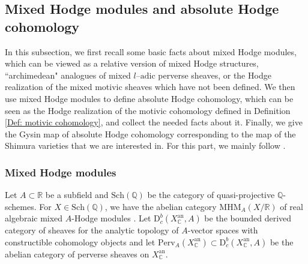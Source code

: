 \documentclass[11pt, a4paper]{amsart}
\theoremstyle{plain}
\theoremstyle{definition}
\numberwithin{equation}{section}
\def\CC{\mathbb{C}}
\def\QQ{\mathbb{Q}}
\def\RR{\mathbb{R}}
\begin{document}
 \subsection{Mixed Hodge modules and absolute Hodge cohomology}
 \label{SS:MHM and abs Hodge coh}
 
 In this subsection, we first recall some basic facts about mixed Hodge modules, which can be viewed as a relative version of mixed Hodge structures, ``archimedean" analogues of mixed $l\text{--}\mathrm{adic}$ perverse sheaves, or the Hodge realization of the mixed motivic sheaves which have not been defined. We then use mixed Hodge modules to define absolute Hodge cohomology, which can be seen as the Hodge realization of the motivic cohomology defined in Definition \ref{Def: motivic cohomology}, and collect the needed facts about it. Finally, we give the Gysin map of absolute Hodge cohomology corresponding to the map of the Shimura varieties that we are interested in.  For this part, we mainly follow \cite[\S2.2]{LemmaI15}. 

 \subsubsection{Mixed Hodge modules}
Let $A \subset \RR$ be a subfield and $\mathrm{Sch}(\QQ)$ be the category of quasi-projective $\QQ$-schemes. For $X \in \mathrm{Sch}(\QQ)$, we have the abelian category $\mathrm{MHM}_{A}(X/\RR)$ of real algebraic mixed $A$-Hodge modules \cite[Definition A.2.4]{HW98}.  Let $\mathrm{D}_{c}^{b}(X^{\mathrm{an}}_{\CC}, A)$ be the bounded derived category of sheaves for the analytic topology of $A$-vector spaces with constructible cohomology objects and let $\mathrm{Perv}_{A}(X^{\mathrm{an}}_{\CC}) \subset \mathrm{D}_{c}^{b}(X^{\mathrm{an}}_{\CC}, A)$ be the abelian category of perverse sheaves on $X^{\mathrm{an}}_{\CC}$.   
\end{document}
